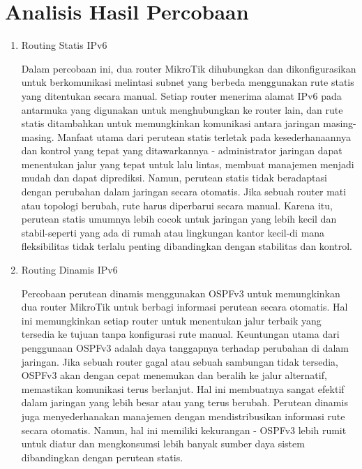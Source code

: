 \section{Analisis Hasil Percobaan}
\begin{enumerate}
    \item Routing Statis IPv6
    
    Dalam percobaan ini, dua router MikroTik dihubungkan dan 
    dikonfigurasikan untuk berkomunikasi melintasi subnet yang 
    berbeda menggunakan rute statis yang ditentukan secara manual. 
    Setiap router menerima alamat IPv6 pada antarmuka yang 
    digunakan untuk menghubungkan ke router lain, dan rute 
    statis ditambahkan untuk memungkinkan komunikasi antara 
    jaringan masing-masing. Manfaat utama dari perutean statis 
    terletak pada kesederhanaannya dan kontrol yang tepat yang 
    ditawarkannya - administrator jaringan dapat menentukan 
    jalur yang tepat untuk lalu lintas, membuat manajemen 
    menjadi mudah dan dapat diprediksi. Namun, perutean statis 
    tidak beradaptasi dengan perubahan dalam jaringan secara 
    otomatis. Jika sebuah router mati atau topologi berubah, 
    rute harus diperbarui secara manual. Karena itu, perutean 
    statis umumnya lebih cocok untuk jaringan yang lebih kecil 
    dan stabil-seperti yang ada di rumah atau lingkungan kantor 
    kecil-di mana fleksibilitas tidak terlalu penting 
    dibandingkan dengan stabilitas dan kontrol.

    \item Routing Dinamis IPv6
    
    Percobaan perutean dinamis menggunakan OSPFv3 untuk 
    memungkinkan dua router MikroTik untuk berbagi informasi 
    perutean secara otomatis. Hal ini memungkinkan setiap router 
    untuk menentukan jalur terbaik yang tersedia ke tujuan tanpa 
    konfigurasi rute manual. Keuntungan utama dari penggunaan 
    OSPFv3 adalah daya tanggapnya terhadap perubahan di dalam 
    jaringan. Jika sebuah router gagal atau sebuah sambungan 
    tidak tersedia, OSPFv3 akan dengan cepat menemukan dan 
    beralih ke jalur alternatif, memastikan komunikasi terus 
    berlanjut. Hal ini membuatnya sangat efektif dalam jaringan 
    yang lebih besar atau yang terus berubah. Perutean dinamis 
    juga menyederhanakan manajemen dengan mendistribusikan 
    informasi rute secara otomatis. Namun, hal ini memiliki 
    kekurangan - OSPFv3 lebih rumit untuk diatur dan 
    mengkonsumsi lebih banyak sumber daya sistem dibandingkan 
    dengan perutean statis.
\end{enumerate}

